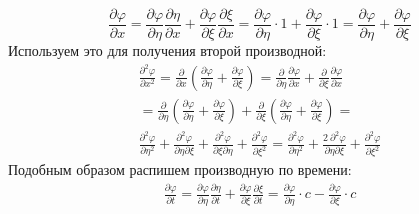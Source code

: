 \documentclass[14pt,a4paper,oneside]{extarticle}	%
\begin{document}
\begin{equation}\label{21}
\frac{\partial \varphi}{\partial x} = \frac{\partial \varphi}{\partial \eta}\frac{\partial \eta}{\partial x} + \frac{\partial \varphi}{\partial \xi}\frac{\partial \xi}{\partial x} =  \frac{\partial \varphi}{\partial \eta}\cdot 1 + \frac{\partial \varphi}{\partial \xi}\cdot 1 = \frac{\partial \varphi}{\partial \eta} + \frac{\partial \varphi}{\partial \xi}
\end{equation}
 Используем это для получения второй производной:
 \begin{eqnarray}\label{22}
 \frac{\partial^{2} \varphi}{\partial x^{2}} = \frac{\partial}{\partial x} \left( \frac{\partial \varphi}{\partial \eta} + \frac{\partial \varphi}{\partial \xi} \right) = \frac{\partial }{\partial \eta}\frac{\partial \varphi}{\partial x} + \frac{\partial}{\partial \xi}\frac{\partial \varphi}{\partial x} \\
  = \frac{\partial }{\partial \eta} \left( \frac{\partial \varphi}{\partial \eta} + \frac{\partial \varphi}{\partial \xi} \right) + \frac{\partial }{\partial \xi} \left( \frac{\partial \varphi}{\partial \eta} + \frac{\partial \varphi}{\partial \xi} \right) = \\
   \frac{\partial^{2} \varphi}{\partial \eta^{2}} + \frac{\partial^{2} \varphi}{\partial \eta \partial \xi} + \frac{\partial^{2} \varphi}{\partial \xi \partial \eta} + \frac{\partial^{2} \varphi}{\partial \xi^{2}} = 
      \frac{\partial^{2} \varphi}{\partial \eta^{2}} + \frac{2\:\partial^{2} \varphi}{\partial \eta \partial \xi} +  \frac{\partial^{2} \varphi}{\partial \xi^{2}}
 \end{eqnarray}
Подобным образом распишем производную по времени:
\begin{eqnarray}\label{23}
\frac{\partial \varphi}{\partial t} = \frac{\partial \varphi}{\partial \eta}\frac{\partial \eta}{\partial t} + \frac{\partial \varphi}{\partial \xi}\frac{\partial \xi}{\partial t} = \frac{\partial \varphi}{\partial \eta}\cdot c - \frac{\partial \varphi}{\partial \xi}\cdot c
\end{eqnarray}
\end{document}

